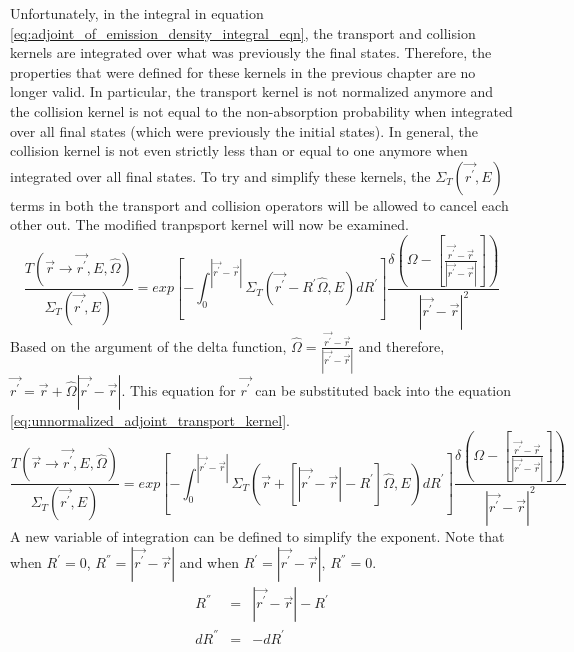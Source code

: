 Unfortunately, in the integral in equation 
\ref{eq:adjoint_of_emission_density_integral_eqn}, the transport and collision 
kernels are integrated over what was previously the final states. Therefore,
the properties that were defined for these kernels in the previous chapter are 
no longer valid. In particular, the transport kernel is not normalized anymore
and the collision kernel is not equal to the non-absorption probability when
integrated over all final states (which were previously the initial states). In
general, the collision kernel is not even strictly less than or equal to one 
anymore when integrated over all final states. To try and simplify these 
kernels, the $\Sigma_T(\vec{r^{'}},E)$ terms in both the transport and collision
operators will be allowed to cancel each other out. The modified tranpsport
kernel will now be examined.
\begin{equation}
  \frac{T(\vec{r} \to \vec{r^{'}},E,\hat{\Omega})}{\Sigma_T(\vec{r^{'}},E)} = 
  exp\left[-\int_0^{|\vec{r^{'}} - \vec{r}|} 
    \Sigma_T(\vec{r^{'}} - R^{'} \hat{\Omega},E)dR^{'} \right]
  \frac{\delta \left(\Omega - \left[\frac{\vec{r^{'}} - \vec{r}}
      {|\vec{r^{'}} - \vec{r}|}\right]\right)}
       {|\vec{r^{'}} - \vec{r}|^2}
  \label{eq:unnormalized_adjoint_transport_kernel}
\end{equation}
Based on the argument of the delta function, 
$\hat{\Omega} = \frac{\vec{r^{'}} - \vec{r}}{|\vec{r^{'}} - \vec{r}|}$ and 
therefore, $\vec{r^{'}} = \vec{r} + \hat{\Omega}|\vec{r^{'}} - \vec{r}|$. This
equation for $\vec{r^{'}}$ can be substituted back into the equation
\ref{eq:unnormalized_adjoint_transport_kernel}.
\begin{equation*}
  \frac{T(\vec{r} \to \vec{r^{'}},E,\hat{\Omega})}{\Sigma_T(\vec{r^{'}},E)} = 
  exp\left[-\int_0^{|\vec{r^{'}} - \vec{r}|} 
    \Sigma_T \left(\vec{r} + \left[|\vec{r^{'}} - \vec{r}| - R^{'} \right] 
    \hat{\Omega},E \right) dR^{'} 
    \right] \frac{\delta \left(\Omega - \left[\frac{\vec{r^{'}} - \vec{r}}
      {|\vec{r^{'}} - \vec{r}|}\right]\right)}
       {|\vec{r^{'}} - \vec{r}|^2}
\end{equation*}
A new variable of integration can be defined to simplify the exponent. Note
that when $R^{'} = 0$, $R^{''} = |\vec{r^{'}} - \vec{r}|$ and when 
$R^{'} = |\vec{r^{'}} - \vec{r}|$, $R^{''} = 0$.
\begin{eqnarray}
  R^{''} & = & |\vec{r^{'}} - \vec{r}| - R^{'} \nonumber \\
  dR^{''} & = & -dR^{'} \nonumber 
\end{eqnarray}

